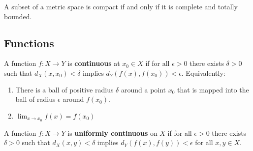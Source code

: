 \documentclass[12pt]{article}
\begin{document}
A subset of a metric space is compact if and only if it is complete and
totally bounded.

\subsection{Functions}

A function $f : X \rightarrow Y$ is \textbf{continuous} at $x_0 \in X$ if
for all $\epsilon > 0$ there exists $\delta > 0$ such that $d_X(x, x_0) <
\delta$ implies $d_Y(f(x), f(x_0)) < \epsilon$. Equivalently:
\begin{enumerate}
    \item There is a ball of positive radius $\delta$
    around a point $x_0$ that is mapped into the ball of radius $\epsilon$ around
    $f(x_0)$.
    \item $\lim_{x \rightarrow x_0} f(x) = f(x_0)$
\end{enumerate}

A function $f : X \rightarrow Y$ is \textbf{uniformly continuous} on $X$ if 
for all $\epsilon > 0$ there exists $\delta > 0$ such that $d_X(x, y) <
\delta$ implies $d_Y(f(x), f(y)) < \epsilon$ for all $x, y \in X$. 
\end{document}

